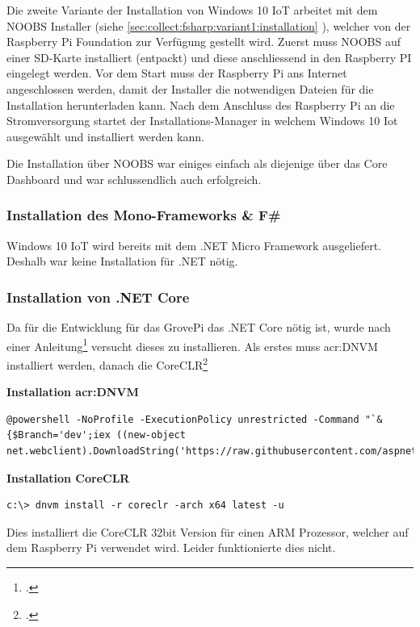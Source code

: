 Die zweite Variante der Installation von Windows 10 IoT arbeitet mit dem NOOBS Installer (siehe \ref{sec:collect:fsharp:variant1:installation} ), welcher von der Raspberry Pi Foundation zur Verfügung gestellt wird. Zuerst muss NOOBS auf einer SD-Karte installiert (entpackt) und diese anschliessend in den Raspberry PI eingelegt werden. Vor dem Start muss der Raspberry Pi ans Internet angeschlossen werden, damit der Installer die notwendigen Dateien für die Installation herunterladen kann. Nach dem Anschluss des Raspberry Pi an die Stromversorgung startet der Installations-Manager in welchem Windows 10 Iot ausgewählt und installiert werden kann.

Die Installation über NOOBS war einiges einfach als diejenige über das Core Dashboard und war schlussendlich auch erfolgreich.

\subsubsection{Installation des Mono-Frameworks \& F\#}
Windows 10 IoT wird bereits mit dem .NET Micro Framework ausgeliefert. Deshalb war keine Installation für .NET nötig.

\subsubsection{Installation von .NET Core}
Da für die Entwicklung für das GrovePi das .NET Core nötig ist, wurde nach einer Anleitung\footcite{How_to_run_DotNET_Core_Application_on_Pi2} versucht dieses zu installieren. Als erstes muss \gls{acr:DNVM} installiert werden, danach die CoreCLR\footcite{CoreCLR_2016-06-17}

\textbf{Installation \gls{acr:DNVM}} \\
\begin{lstlisting}
@powershell -NoProfile -ExecutionPolicy unrestricted -Command "`&{$Branch='dev';iex ((new-object net.webclient).DownloadString('https://raw.githubusercontent.com/aspnet/Home/dev/dnvminstall.ps1'))}"'
\end{lstlisting}

\textbf{Installation CoreCLR} \\
\begin{lstlisting}
c:\> dnvm install -r coreclr -arch x64 latest -u
\end{lstlisting}
Dies installiert die CoreCLR 32bit Version für einen ARM Prozessor, welcher auf dem Raspberry Pi verwendet wird. Leider funktionierte dies nicht. 

